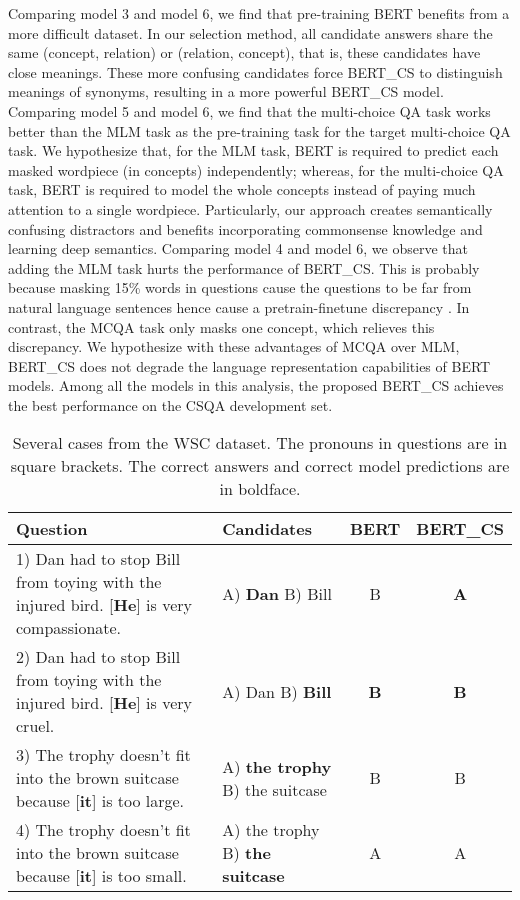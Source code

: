\documentclass[11pt,a4paper]{article}
\begin{document}
Comparing model 3 and model 6, we find that pre-training BERT benefits from a more difficult dataset.  In our selection method, all candidate answers share the same (concept, relation) or (relation, concept), that is, these candidates have close meanings. These more confusing candidates force BERT\_CS to distinguish meanings of synonyms, resulting in a more powerful BERT\_CS model.
Comparing model 5 and model 6, we find that the multi-choice QA task works better than the MLM task as the pre-training task for the target multi-choice QA task. 
We hypothesize that, for the MLM task, BERT is required to predict each masked wordpiece (in concepts) independently; whereas, for the multi-choice QA task, BERT is required to model the whole concepts instead of paying much attention to a single wordpiece. Particularly, our approach creates semantically confusing distractors and benefits incorporating commonsense knowledge and learning deep semantics.
Comparing model 4 and model 6, we observe that adding the MLM task hurts the performance of BERT\_CS. This is probably because masking 15\% words in questions cause the questions to be far from natural language sentences hence cause a pretrain-finetune discrepancy \citep{yang2019xlnet}. In contrast, the MCQA task only masks one concept, which relieves this discrepancy. We hypothesize with these advantages of MCQA over MLM, BERT\_CS does not degrade the language representation capabilities of BERT models. 
Among all the models in this analysis, the proposed BERT\_CS achieves the best performance on the CSQA development set.

\begin{table*}[t!]
	\begin{center}
		\small
		\begin{tabular}{p{8cm}|p{1.95cm}|c|c}
			\toprule
            \textbf{Question}   & \textbf{Candidates}  & \textbf{BERT}       & \textbf{BERT\_CS}  \\
            \midrule
            1) Dan had to stop Bill from toying with the injured bird. [\textbf{He}] is very compassionate.
            &A) \textbf{Dan}  B) Bill 
            & B & \textbf{A} \\
            \midrule
            2) Dan had to stop Bill from toying with the injured bird. [\textbf{He}] is very cruel.
            &A) Dan B) \textbf{Bill}
            & \textbf{B} & \textbf{B} \\
            \midrule
            3) The trophy doesn't fit into the brown suitcase because [\textbf{it}] is too large.
            &A) \textbf{the trophy} B) the suitcase
            & B    & B  \\
            \midrule
            4) The trophy doesn't fit into the brown suitcase because [\textbf{it}] is too small.   
            &A) the trophy B) \textbf{the suitcase}
            & A    & A  \\
			\bottomrule
		\end{tabular}
	\end{center}
	\caption{Several cases from the WSC dataset. The pronouns in questions are in square brackets. The correct answers and correct model predictions are in boldface.}
	\label{tab:case_study}
\end{table*}
\end{document}
